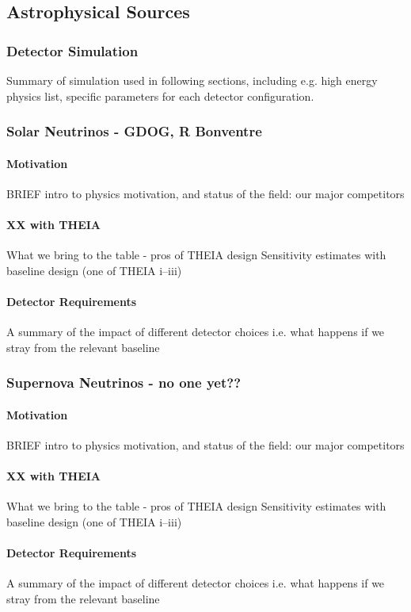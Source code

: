 \documentclass[11pt,prd,letterpaper,amsmath,amssymb,final,nofootinbib
,unsortedaddress,superscriptaddress
]{revtex4-1}
\begin{document}
\subsection{Astrophysical Sources}
\subsubsection{Detector Simulation}
Summary of simulation used in following sections, including e.g. high energy physics list, specific parameters for each detector configuration.
\subsubsection{Solar Neutrinos - GDOG, R Bonventre}
\paragraph{Motivation}
BRIEF intro to physics motivation, and status of the field: our major competitors
\paragraph{XX with THEIA}
What we bring to the table - pros of THEIA design \newline
Sensitivity estimates with baseline design (one of THEIA i--iii)
\paragraph{Detector Requirements}
A summary of the impact of different detector choices i.e. what happens if we stray from the relevant baseline
\subsubsection{Supernova Neutrinos - no one yet??}
\paragraph{Motivation}
BRIEF intro to physics motivation, and status of the field: our major competitors
\paragraph{XX with THEIA}
What we bring to the table - pros of THEIA design \newline
Sensitivity estimates with baseline design (one of THEIA i--iii)
\paragraph{Detector Requirements}
A summary of the impact of different detector choices i.e. what happens if we stray from the relevant baseline
\end{document}
